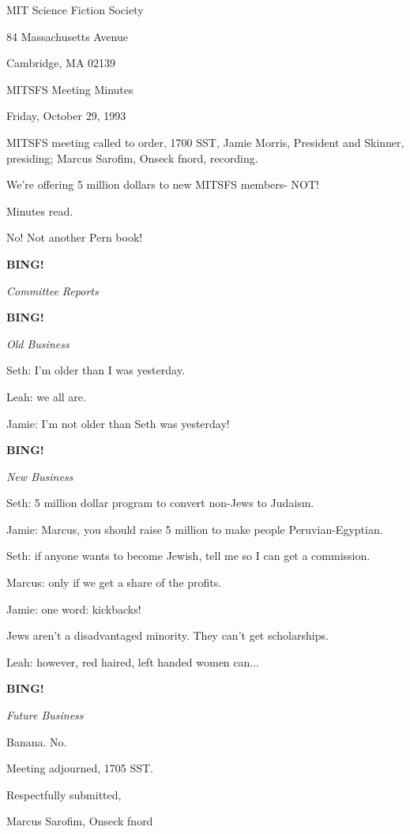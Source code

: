 \documentclass[12pt]{article}
\newcommand{\bing}{{\bf BING!} }
\newcommand{\goto}[1]{\bing \vskip 12pt \centerline{{\em{#1}}}}
\begin{document}
\begin{center}

MIT Science Fiction Society 

84 Massachusetts Avenue

Cambridge, MA 02139

\vspace{12pt}

MITSFS Meeting Minutes 

Friday, October 29, 1993

\end{center}
 
\vspace{18pt}

\setlength{\parskip}{6pt}

\noindent
MITSFS meeting called to order, 1700 SST,
Jamie Morris, President and Skinner, presiding; Marcus Sarofim, Onseck fnord, recording.

We're offering 5 million dollars to new MITSFS members- NOT!

Minutes read.

No! Not another Pern book!

\goto{Committee Reports}

\goto{Old Business}

Seth: I'm older than I was yesterday.

Leah: we all are.

Jamie: I'm not older than Seth was yesterday!

\goto{New Business}

Seth: 5 million dollar program to convert non-Jews to Judaism.

Jamie: Marcus, you should raise 5 million to make people Peruvian-Egyptian.

Seth: if anyone wants to become Jewish, tell me so I can get a commission.

Marcus: only if we get a share of the profits.

Jamie: one word: kickbacks!

Jews aren't a disadvantaged minority. They can't get scholarships.

Leah: however, red haired, left handed women can...

\goto{Future Business}

Banana. No.

\vspace{12pt}

\noindent
Meeting adjourned, 1705 SST.

\vspace{18pt}

\centerline{Respectfully submitted,}
\centerline{Marcus Sarofim, Onseck fnord}
\end{document}
